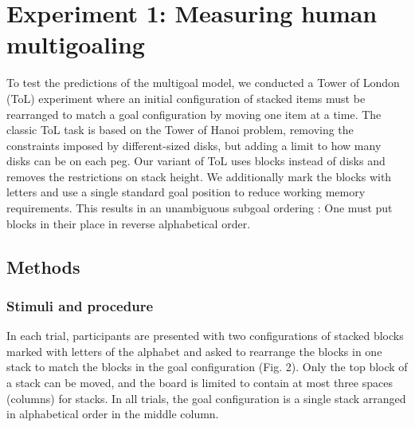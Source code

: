 \documentclass[10pt,letterpaper]{article}
\newcommand{\todo}[1]{\textcolor{red}{\textsc{[TODO: #1]}}}
\begin{document}
\section{Experiment 1: Measuring human multigoaling}

To test the predictions of the multigoal model, we conducted a Tower of London (ToL) experiment \citep{Shallice1982} where an initial configuration of stacked items must be rearranged to match a goal configuration by moving one item at a time. The classic ToL task is based on the Tower of Hanoi problem, removing the constraints imposed by different-sized disks, but adding a limit to how many disks can be on each peg. Our variant of ToL uses blocks instead of disks and removes the restrictions on stack height. We additionally mark the blocks with letters and use a single standard goal position to reduce working memory requirements. This results in an unambiguous subgoal ordering \citep{Kaller2011}: One must put blocks in their place in reverse alphabetical order.





\subsection{Methods}
\subsubsection{Stimuli and procedure}

In each trial, participants are presented with two configurations of stacked blocks marked with letters of the alphabet and asked to rearrange the blocks in one stack to match the blocks in the goal configuration (Fig. 2). Only the top block of a stack can be moved, and the board is limited to contain at most three spaces (columns) for stacks. In all trials, the goal configuration is a single stack arranged in alphabetical order in the middle column.
\end{document}
